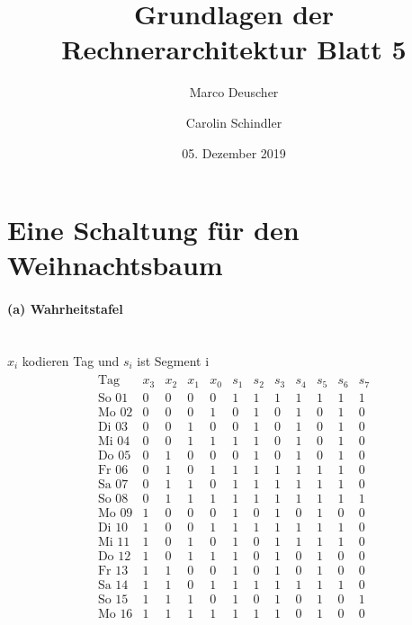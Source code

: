 \documentclass[a4paper]{article}
\title{Grundlagen der Rechnerarchitektur Blatt 5}
\author{Marco Deuscher \and Carolin Schindler}
\date{05. Dezember 2019}
\begin{document}
\maketitle
\section{Eine Schaltung für den Weihnachtsbaum}

\paragraph{(a) Wahrheitstafel}\mbox{}\\
$x_i$ kodieren Tag und $s_i$ ist Segment i
\begin{align*}
	\begin{array}{r|cccc|ccccccc}
		\text{Tag}& x_3&x_2&x_1&x_0 &s_1&s_2&s_3&s_4&s_5&s_6&s_7\\
		\hline
		\text{So } 01 &0&0&0&0 &1&1&1&1&1&1&1\\
		\text{Mo } 02 &0&0&0&1 &0&1&0&1&0&1&0\\
		\text{Di } 03 &0&0&1&0 &0&1&0&1&0&1&0\\
		\text{Mi } 04 &0&0&1&1 &1&1&0&1&0&1&0\\
		\text{Do } 05 &0&1&0&0 &0&1&0&1&0&1&0\\
		\text{Fr } 06 &0&1&0&1 &1&1&1&1&1&1&0\\
		\text{Sa } 07 &0&1&1&0 &1&1&1&1&1&1&0\\
		\text{So } 08 &0&1&1&1 &1&1&1&1&1&1&1\\
		\text{Mo } 09 &1&0&0&0 &1&0&1&0&1&0&0\\
		\text{Di } 10 &1&0&0&1 &1&1&1&1&1&1&0\\
		\text{Mi } 11 &1&0&1&0 &1&0&1&1&1&1&0\\
		\text{Do } 12 &1&0&1&1 &1&0&1&0&1&0&0\\
		\text{Fr } 13 &1&1&0&0 &1&0&1&0&1&0&0\\
		\text{Sa } 14 &1&1&0&1 &1&1&1&1&1&1&0\\
		\text{So } 15 &1&1&1&0 &1&0&1&0&1&0&1\\
		\text{Mo } 16 &1&1&1&1 &1&1&1&0&1&0&0\\
	\end{array}
\end{align*}
\end{document}
